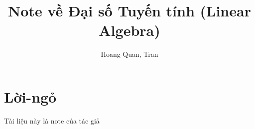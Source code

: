 \documentclass{book}[14pt]
\title{Note về Đại số Tuyến tính (Linear Algebra)}
\author{Hoang-Quan, Tran}
\begin{document}
\maketitle

\section{Lời-ngỏ}
Tài liệu này là note của tác giả


\end{document}
